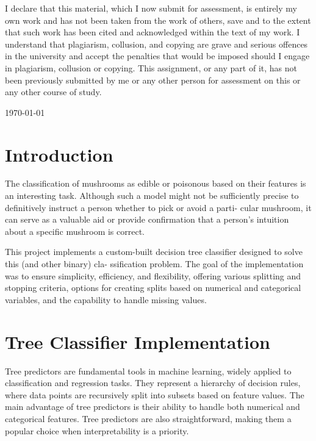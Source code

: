 \documentclass{article}
\begin{document}
\begin{titlepage}
\begin{center}
\begin{figure}[h!]
\end{figure}
\end{center}
\vfill
\begin{center}
{\small{I declare that this material, which I now submit for assessment, is entirely my own work and has not been taken from the work of others, save and to the extent that such work has been cited and acknowledged within the text of my work. I understand that plagiarism, collusion, and copying are grave and serious offences in the university and accept the penalties that would be imposed should I engage in plagiarism, collusion or copying. This assignment, or any part of it, has not been previously submitted by me or any other person for assessment on this or any other course of study.}}
\end{center}
\vfill
    {\large \today \par}
    \vfill
\end{titlepage}

\tableofcontents

\section{Introduction}

The classification of mushrooms as edible or poisonous based on their features is an interesting task. Although such a model might not be sufficiently precise to definitively instruct a person whether to pick or avoid a parti- cular mushroom, it can serve as a valuable aid or provide confirmation that a person's intuition about a specific mushroom is correct.

This project implements a custom-built decision tree classifier designed to solve this (and other binary) cla- ssification problem. The goal of the implementation was to ensure simplicity, efficiency, and flexibility, offering various splitting and stopping criteria, options for creating splits based on numerical and categorical variables, and the capability to handle missing values.

\section{Tree Classifier Implementation}

Tree predictors are fundamental tools in machine learning, widely applied to classification and regression tasks. They represent a hierarchy of decision rules, where data points are recursively split into subsets based on feature values. The main advantage of tree predictors is their ability to handle both numerical and categorical features. Tree predictors are also straightforward, making them a popular choice when interpretability is a priority.
\end{document}
